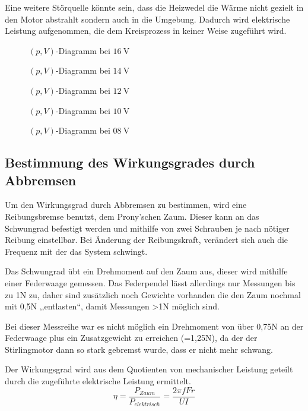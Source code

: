 Eine weitere Störquelle könnte sein, dass die Heizwedel die Wärme nicht gezielt in den Motor abstrahlt sondern auch in die Umgebung. Dadurch wird elektrische Leistung aufgenommen, die dem Kreisprozess in keiner Weise zugeführt wird.
\begin{figure}[h!]
	\centering
	
	\caption{$ (p,V) $-Diagramm bei $ \SI{16}{\volt} $}
	\label{fig:pV16}
\end{figure}
\begin{figure}[h!]
	\centering
	
	\caption{$ (p,V) $-Diagramm bei $ \SI{14}{\volt} $}
	\label{fig:pV14}
\end{figure}
\begin{figure}[h!]
	\centering
	
	\caption{$ (p,V) $-Diagramm bei $ \SI{12}{\volt} $}
	\label{fig:pV12}
\end{figure}
\begin{figure}[h!]
	\centering
	
	\caption{$ (p,V) $-Diagramm bei $ \SI{10}{\volt} $}
	\label{fig:pV10}
\end{figure}
\begin{figure}[h!]
	\centering
	
	\caption{$ (p,V) $-Diagramm bei $ \SI{08}{\volt} $}
	\label{fig:pV08}
\end{figure}
\newpage
\subsection{Bestimmung des Wirkungsgrades durch Abbremsen}

Um den Wirkungsgrad durch Abbremsen zu bestimmen, wird eine Reibungsbremse
benutzt, dem Prony'schen Zaum. Dieser kann an das Schwungrad befestigt
werden und mithilfe von zwei Schrauben je nach nötiger Reibung einstellbar.
Bei Änderung der Reibungskraft, verändert sich auch die Frequenz mit
der das System schwingt.

Das Schwungrad übt ein Drehmoment auf den Zaum aus, dieser wird mithilfe
einer Federwaage gemessen. Das Federpendel lässt allerdings nur Messungen
bis zu 1N zu, daher sind zusätzlich noch Gewichte vorhanden die den
Zaum nochmal mit 0,5N ,,entlasten``, damit Messungen >1N möglich
sind.

Bei dieser Messreihe war es nicht möglich ein Drehmoment von über
0,75N an der Federwaage plus ein Zusatzgewicht zu erreichen (=1,25N),
da der der Stirlingmotor dann so stark gebremst wurde, dass er nicht
mehr schwang. 

Der Wirkungsgrad wird aus dem Quotienten von mechanischer Leistung
geteilt durch die zugeführte elektrische Leistung ermittelt.
\[
\eta=\frac{P_{Zaum}}{P_{elektrisch}}=\frac{2\pi fFr}{UI}
\]



